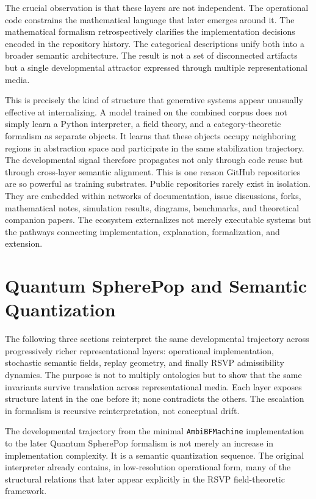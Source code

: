 \documentclass[12pt]{article}
\begin{document}
The crucial observation is that these layers are not independent. The operational
code constrains the mathematical language that later emerges around it. The
mathematical formalism retrospectively clarifies the implementation decisions
encoded in the repository history. The categorical descriptions unify both into
a broader semantic architecture. The result is not a set of disconnected
artifacts but a single developmental attractor expressed through multiple
representational media.

This is precisely the kind of structure that generative systems appear unusually
effective at internalizing. A model trained on the combined corpus does not
simply learn a Python interpreter, a field theory, and a category-theoretic
formalism as separate objects. It learns that these objects occupy neighboring
regions in abstraction space and participate in the same stabilization
trajectory. The developmental signal therefore propagates not only through code
reuse but through cross-layer semantic alignment. This is one reason GitHub
repositories are so powerful as training substrates. Public repositories rarely
exist in isolation. They are embedded within networks of documentation, issue
discussions, forks, mathematical notes, simulation results, diagrams, benchmarks,
and theoretical companion papers. The ecosystem externalizes not merely
executable systems but the pathways connecting implementation, explanation,
formalization, and extension.

\section{Quantum SpherePop and Semantic Quantization}

The following three sections reinterpret the same developmental trajectory
across progressively richer representational layers: operational implementation,
stochastic semantic fields, replay geometry, and finally RSVP admissibility
dynamics. The purpose is not to multiply ontologies but to show that the same
invariants survive translation across representational media. Each layer
exposes structure latent in the one before it; none contradicts the others.
The escalation in formalism is recursive reinterpretation, not conceptual
drift.

The developmental trajectory from the minimal \texttt{AmbiBFMachine}
implementation to the later Quantum SpherePop formalism is not merely an
increase in implementation complexity. It is a semantic quantization sequence.
The original interpreter already contains, in low-resolution operational form,
many of the structural relations that later appear explicitly in the RSVP
field-theoretic framework.
\end{document}
